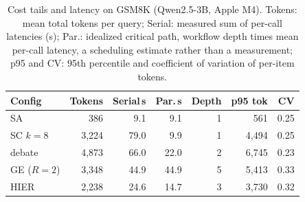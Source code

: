 \begin{table}[t]\centering\small
\caption{Cost tails and latency on GSM8K (Qwen2.5-3B, Apple M4). Tokens: mean
total tokens per query; Serial: measured sum of per-call latencies (s); Par.:
idealized critical path, workflow depth times mean per-call latency, a scheduling
estimate rather than a measurement; p95 and CV: 95th percentile and coefficient of
variation of per-item tokens.}
\label{tab:latency}
\setlength{\tabcolsep}{4pt}
\begin{tabular}{lrrrrrr}
\toprule
Config & Tokens & Serial\,s & Par.\,s & Depth & p95 tok & CV \\
\midrule
SA           & 386  & 9.1  & 9.1  & 1 & 561  & 0.25 \\
SC $k{=}8$   & 3{,}224 & 79.0 & 9.9  & 1 & 4{,}494 & 0.25 \\
debate       & 4{,}873 & 66.0 & 22.0 & 2 & 6{,}745 & 0.23 \\
GE ($R{=}2$) & 3{,}348 & 44.9 & 44.9 & 5 & 5{,}413 & 0.33 \\
HIER         & 2{,}238 & 24.6 & 14.7 & 3 & 3{,}730 & 0.32 \\
\bottomrule
\end{tabular}
\end{table}
